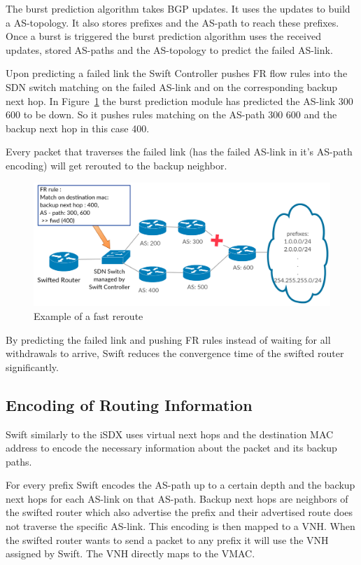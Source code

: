 The burst prediction algorithm takes BGP updates. It uses the updates to build a AS-topology. It also stores prefixes and the AS-path to reach these prefixes. Once a burst is triggered the burst prediction algorithm uses the received updates, stored AS-paths and the AS-topology to predict the failed AS-link.

Upon predicting a failed link the Swift Controller pushes FR flow rules into the SDN switch matching on the failed AS-link and on the corresponding backup next hop. In Figure~\ref{fig:swift_FR} the burst prediction module has predicted the AS-link 300 600 to be down. So it pushes rules matching on the AS-path 300 600 and the backup next hop in this case 400.

Every packet that traverses the failed link (has the failed AS-link in it's AS-path encoding) will get rerouted to the backup neighbor.
\begin{figure}[h]
\center
\includegraphics[scale = 0.32]{Figures/bckgrnd_swift_fr.pdf}
\caption{Example of a fast reroute}
\label{fig:swift_FR}
\end{figure}

By predicting the failed link and pushing FR rules instead of waiting for all withdrawals to arrive, Swift reduces the convergence time of the swifted router significantly.

\newpage

\subsection{\label{chapter2:Swift:encoding_of_routing_information}Encoding of Routing Information}
Swift similarly to the iSDX uses virtual next hops and the destination MAC address to encode the necessary information about the packet and its backup paths.

For every prefix Swift encodes the AS-path up to a certain depth and the backup next hops for each AS-link on that AS-path. Backup next hops are neighbors of the swifted router which also advertise the prefix and their advertised route does not traverse the specific AS-link. This encoding is then mapped to a VNH. When the swifted router wants to send a packet to any prefix it will use the VNH assigned by Swift. The VNH directly maps to the VMAC. 


